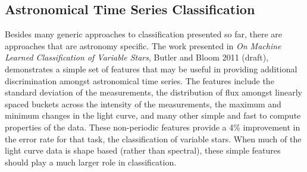 	\subsection{Astronomical Time Series Classification}
	Besides many generic approaches to classification presented so far, there are approaches that are astronomy specific. The work presented in \emph{On Machine Learned Classification of Variable Stars}, Butler and Bloom 2011 (draft), demonstrates a simple set of features that may be useful in providing additional discrimination amongst astronomical time series. The features include the standard deviation of the measurements, the distribution of flux amongst linearly spaced buckets across the intensity of the measurements, the maximum and minimum changes in the light curve, and many other simple and fast to compute properties of the data. These non-periodic features provide a 4\% improvement in the error rate for that task, the classification of variable stars. When much of the light curve data is shape based (rather than spectral), these simple features should play a much larger role in classification.
%	
	
	
%	
%
			
